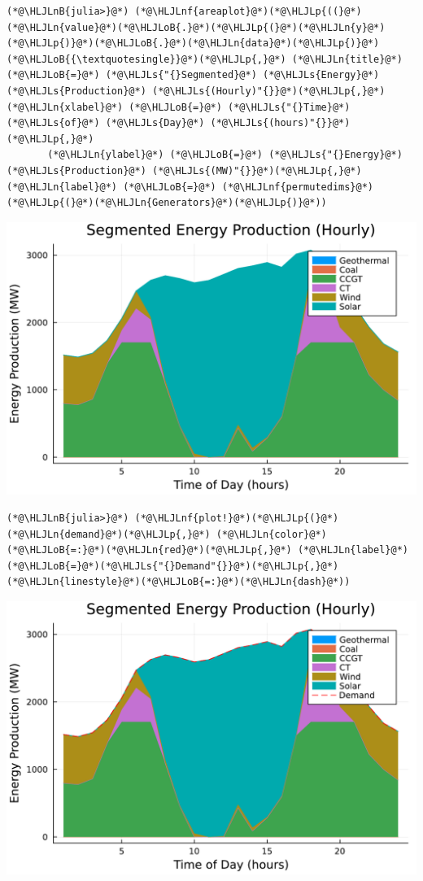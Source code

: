 \documentclass[12pt,a4paper]{article}
\newcommand{\HLJLn}[1]{#1}
\newcommand{\HLJLnf}[1]{\textcolor[RGB]{66,102,213}{#1}}
\newcommand{\HLJLs}[1]{\textcolor[RGB]{201,61,57}{#1}}
\newcommand{\HLJLnB}[1]{\textcolor[RGB]{59,151,46}{#1}}
\newcommand{\HLJLoB}[1]{\textcolor[RGB]{102,102,102}{\textbf{#1}}}
\newcommand{\HLJLp}[1]{#1}
\begin{document}
\begin{lstlisting}
(*@\HLJLnB{julia>}@*) (*@\HLJLnf{areaplot}@*)(*@\HLJLp{((}@*)(*@\HLJLn{value}@*)(*@\HLJLoB{.}@*)(*@\HLJLp{(}@*)(*@\HLJLn{y}@*)(*@\HLJLp{)}@*)(*@\HLJLoB{.}@*)(*@\HLJLn{data}@*)(*@\HLJLp{)}@*)(*@\HLJLoB{{\textquotesingle}}@*)(*@\HLJLp{,}@*) (*@\HLJLn{title}@*) (*@\HLJLoB{=}@*) (*@\HLJLs{"{}Segmented}@*) (*@\HLJLs{Energy}@*) (*@\HLJLs{Production}@*) (*@\HLJLs{(Hourly)"{}}@*)(*@\HLJLp{,}@*) (*@\HLJLn{xlabel}@*) (*@\HLJLoB{=}@*) (*@\HLJLs{"{}Time}@*) (*@\HLJLs{of}@*) (*@\HLJLs{Day}@*) (*@\HLJLs{(hours)"{}}@*)(*@\HLJLp{,}@*)
       (*@\HLJLn{ylabel}@*) (*@\HLJLoB{=}@*) (*@\HLJLs{"{}Energy}@*) (*@\HLJLs{Production}@*) (*@\HLJLs{(MW)"{}}@*)(*@\HLJLp{,}@*) (*@\HLJLn{label}@*) (*@\HLJLoB{=}@*) (*@\HLJLnf{permutedims}@*)(*@\HLJLp{(}@*)(*@\HLJLn{Generators}@*)(*@\HLJLp{)}@*))
\end{lstlisting}
\includegraphics[width=\linewidth]{figures/solution-template_6_2.pdf}

\begin{lstlisting}
(*@\HLJLnB{julia>}@*) (*@\HLJLnf{plot!}@*)(*@\HLJLp{(}@*)(*@\HLJLn{demand}@*)(*@\HLJLp{,}@*) (*@\HLJLn{color}@*)(*@\HLJLoB{=:}@*)(*@\HLJLn{red}@*)(*@\HLJLp{,}@*) (*@\HLJLn{label}@*)(*@\HLJLoB{=}@*)(*@\HLJLs{"{}Demand"{}}@*)(*@\HLJLp{,}@*) (*@\HLJLn{linestyle}@*)(*@\HLJLoB{=:}@*)(*@\HLJLn{dash}@*))
\end{lstlisting}
\includegraphics[width=\linewidth]{figures/solution-template_6_3.pdf}
\end{document}
